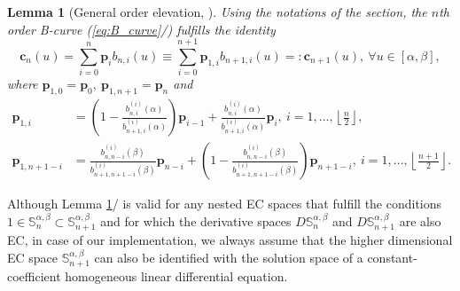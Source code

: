 \documentclass[b5paper, twosided]{book}
\newtheorem{lemma}{Lemma}[chapter]
\DeclareRobustCommand{\mref}[1]{\ref{#1}{\relsize{-1}/\pageref{#1}}}
\begin{document}
\begin{lemma}[General order elevation, \textnormal{\citep{MazureLaurent1998}}]
    \label{lem:general_order_elevation}
    Using the notations of the section, the $n$th order B-curve (\mref{eq:B_curve}) fulfills the identity
    $$
    \mathbf{c}_n\left(u\right)=\sum_{i=0}^n \mathbf{p}_i b_{n,i}\left(u\right)\equiv\sum_{i=0}^{n+1}\mathbf{p}_{1,i} b_{n+1,i}\left(u\right)=:\mathbf{c}_{n+1}\left(u\right),~\forall u \in \left[\alpha, \beta\right],
    $$
    where $\mathbf{p}_{1,0} = \mathbf{p}_{0}, ~\mathbf{p}_{1,n+1} = \mathbf{p}_n$ and
    \begin{align}
    \mathbf{p}_{1,i} 
    &= 
    \left(
    1-
    \frac
    {
        b_{n,i}^{\left(i\right)}\left(\alpha\right)
    }
    {
        b_{n+1,i}^{\left(i\right)}\left(\alpha\right)
    }
    \right)
    \mathbf{p}_{i-1}
    +
    \frac
    {
        b_{n,i}^{\left(i\right)}\left(\alpha\right)
    }
    {
        b_{n+1,i}^{\left(i\right)}\left(\alpha\right)
    }
    \mathbf{p}_i,~i=1,\ldots,\left\lfloor \tfrac{n}{2} \right\rfloor,
    \label{eq:order_elevation_inner_points_first_half}
    \\
    \mathbf{p}_{1,n+1-i} 
    & = \frac{b_{n,n-i}^{\left(i\right)}\left(\beta\right)}{b_{n+1,n+1-i}^{\left(i\right)}\left(\beta\right)} \mathbf{p}_{n-i} + 
    \left(1-\frac{b_{n,n-i}^{\left(i\right)}\left(\beta\right)}{b_{n+1,n+1-i}^{\left(i\right)}\left(\beta\right)}\right)\mathbf{p}_{n+1-i},~i=1,\ldots,\left\lfloor\tfrac{n+1}{2}\right\rfloor.
    \label{eq:order_elevation_inner_points_second_half}
    \end{align}
\end{lemma}


Although Lemma \mref{lem:general_order_elevation} is valid for any nested EC spaces that fulfill the conditions $1\in \mathbb{S}_n^{\alpha,\beta} \subset \mathbb{S}_{n+1}^{\alpha,\beta}$ and for which the derivative spaces $D\mathbb{S}_{n}^{\alpha,\beta}$ and $D\mathbb{S}_{n+1}^{\alpha,\beta}$ are also EC, in case of our implementation, we always assume that the higher dimensional EC space $\mathbb{S}_{n+1}^{\alpha,\beta}$ can also be identified with the solution space of a constant-coefficient homogeneous linear differential equation.

\bigskip{} 
\end{document}
